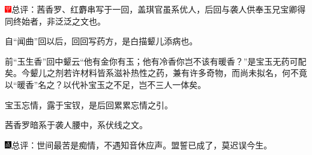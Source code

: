 {\includegraphics[width=3mm]{../Images/00002}\kaishu 总评：茜香罗、红麝串写于一回，盖琪官虽系优人，后回与袭人供奉玉兄宝卿得同终始者，非泛泛之文也。}

{\kaishu 自“闻曲”回以后，回回写药方，是白描颦儿添病也。}

{\kaishu 前“玉生香”回中颦云“他有金你有玉；他有冷香你岂不该有暖香？”是宝玉无药可配矣。今颦儿之剂若许材料皆系滋补热性之药，兼有许多奇物，而尚未拟名，何不竟以“暖香”名之？以代补宝玉之不足，岂不三人一体矣。}

{\kaishu 宝玉忘情，露于宝钗，是后回累累忘情之引。}

{\kaishu 茜香罗暗系于袭人腰中，系伏线之文。}

{\includegraphics[width=3mm]{../Images/00005}\kaishu 总评：世间最苦是痴情，不遇知音休应声。盟誓已成了，莫迟误今生。}